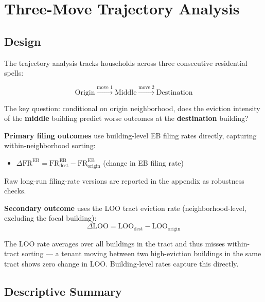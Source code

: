 \documentclass[
  11pt,
]{article}
\providecommand{\tightlist}{%
  \setlength{\itemsep}{0pt}\setlength{\parskip}{0pt}}
\begin{document}
\section{Three-Move Trajectory
Analysis}\label{three-move-trajectory-analysis}

\subsection{Design}\label{design}

The trajectory analysis tracks households across three consecutive
residential spells:

\[
\text{Origin} \xrightarrow{\text{move 1}} \text{Middle} \xrightarrow{\text{move 2}} \text{Destination}
\]

The key question: conditional on origin neighborhood, does the eviction
intensity of the \textbf{middle} building predict worse outcomes at the
\textbf{destination} building?

\textbf{Primary filing outcomes} use building-level EB filing rates
directly, capturing within-neighborhood sorting:

\begin{itemize}
\tightlist
\item
  \(\Delta\text{FR}^{\text{EB}} = \text{FR}^{\text{EB}}_{\text{dest}} - \text{FR}^{\text{EB}}_{\text{origin}}\)
  (change in EB filing rate)
\end{itemize}

Raw long-run filing-rate versions are reported in the appendix as
robustness checks.

\textbf{Secondary outcome} uses the LOO tract eviction rate
(neighborhood-level, excluding the focal building): \[
\Delta\text{LOO} = \text{LOO}_{\text{dest}} - \text{LOO}_{\text{origin}}
\]

The LOO rate averages over all buildings in the tract and thus misses
within-tract sorting --- a tenant moving between two high-eviction
buildings in the same tract shows zero change in LOO. Building-level
rates capture this directly.

\subsection{Descriptive Summary}\label{descriptive-summary}

\begingroup\fontsize{9}{11}\selectfont
\end{document}
